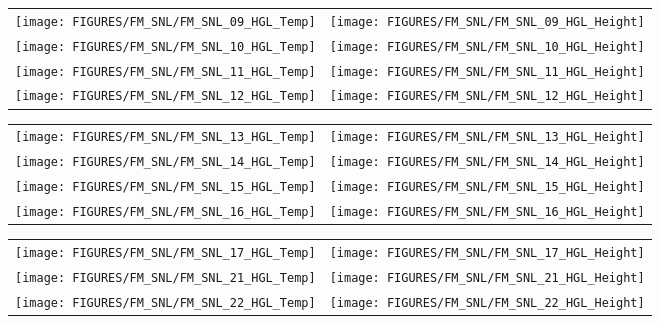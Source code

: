 \begin{figure}[p]
\begin{tabular*}{\textwidth}{l@{\extracolsep{\fill}}r}
\texttt{[image: FIGURES/FM\_SNL/FM\_SNL\_09\_HGL\_Temp]} &
\texttt{[image: FIGURES/FM\_SNL/FM\_SNL\_09\_HGL\_Height]} \\\texttt{[image: FIGURES/FM\_SNL/FM\_SNL\_10\_HGL\_Temp]} &
\texttt{[image: FIGURES/FM\_SNL/FM\_SNL\_10\_HGL\_Height]} \\
\texttt{[image: FIGURES/FM\_SNL/FM\_SNL\_11\_HGL\_Temp]} &
\texttt{[image: FIGURES/FM\_SNL/FM\_SNL\_11\_HGL\_Height]} \\
\texttt{[image: FIGURES/FM\_SNL/FM\_SNL\_12\_HGL\_Temp]} &
\texttt{[image: FIGURES/FM\_SNL/FM\_SNL\_12\_HGL\_Height]}
\end{tabular*}
\end{figure}

\begin{figure}[p]
\begin{tabular*}{\textwidth}{l@{\extracolsep{\fill}}r}
\texttt{[image: FIGURES/FM\_SNL/FM\_SNL\_13\_HGL\_Temp]} &
\texttt{[image: FIGURES/FM\_SNL/FM\_SNL\_13\_HGL\_Height]} \\
\texttt{[image: FIGURES/FM\_SNL/FM\_SNL\_14\_HGL\_Temp]} &
\texttt{[image: FIGURES/FM\_SNL/FM\_SNL\_14\_HGL\_Height]} \\
\texttt{[image: FIGURES/FM\_SNL/FM\_SNL\_15\_HGL\_Temp]} &
\texttt{[image: FIGURES/FM\_SNL/FM\_SNL\_15\_HGL\_Height]} \\
\texttt{[image: FIGURES/FM\_SNL/FM\_SNL\_16\_HGL\_Temp]} &
\texttt{[image: FIGURES/FM\_SNL/FM\_SNL\_16\_HGL\_Height]}
\end{tabular*}\end{figure}

\begin{figure}[p]
\begin{tabular*}{\textwidth}{l@{\extracolsep{\fill}}r}
\texttt{[image: FIGURES/FM\_SNL/FM\_SNL\_17\_HGL\_Temp]} &
\texttt{[image: FIGURES/FM\_SNL/FM\_SNL\_17\_HGL\_Height]} \\
\texttt{[image: FIGURES/FM\_SNL/FM\_SNL\_21\_HGL\_Temp]} &
\texttt{[image: FIGURES/FM\_SNL/FM\_SNL\_21\_HGL\_Height]} \\
\texttt{[image: FIGURES/FM\_SNL/FM\_SNL\_22\_HGL\_Temp]} &
\texttt{[image: FIGURES/FM\_SNL/FM\_SNL\_22\_HGL\_Height]}
\end{tabular*}
\end{figure}

